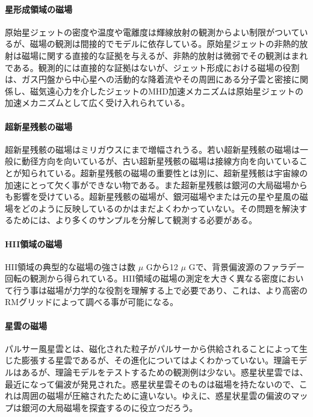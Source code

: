 \paragraph{星形成領域の磁場}

原始星ジェットの密度や温度や電離度は輝線放射の観測からよい制限がついているが、磁場の観測は間接的でモデルに依存している。原始星ジェットの非熱的放射は磁場に関する直接的な証拠を与えるが、非熱的放射は微弱でその観測はまれである。観測的には直接的な証拠はないが、ジェット形成における磁場の役割は、ガス円盤から中心星への活動的な降着流やその周囲にある分子雲と密接に関係し、磁気遠心力を介したジェットのMHD加速メカニズムは原始星ジェットの加速メカニズムとして広く受け入れられている。

\paragraph{超新星残骸の磁場}

超新星残骸の磁場はミリガウスにまで増幅されうる。若い超新星残骸の磁場は一般に動径方向を向いているが、古い超新星残骸の磁場は接線方向を向いていることが知られている。超新星残骸の磁場の重要性とは別に、超新星残骸は宇宙線の加速にとって欠く事ができない物である。また超新星残骸は銀河の大局磁場からも影響を受けている。超新星残骸の磁場が、銀河磁場やまたは元の星や星風の磁場をどのように反映しているのかはまだよくわかっていない。その問題を解決するためには、より多くのサンプルを分解して観測する必要がある。

\paragraph{HII領域の磁場}

HII領域の典型的な磁場の強さは数 $\mu$ Gから12 $\mu$ Gで\citep{2007A&A...463..993S, 2010A&A...515A..64G, 2011ApJ...736...83H}、背景偏波源のファラデー回転の観測から得られている。HII領域の磁場の測定を大きく異なる密度において行う事は磁場が力学的な役割を理解する上で必要であり、これは、より高密のRMグリッドによって調べる事が可能になる。

\paragraph{星雲の磁場}

パルサー風星雲とは、磁化された粒子がパルサーから供給されることによって生じた膨張する星雲であるが、その進化についてはよくわかっていない。理論モデルはあるが、理論モデルをテストするための観測例は少ない。惑星状星雲では、最近になって偏波が発見された。惑星状星雲そのものは磁場を持たないので、これは周囲の磁場が圧縮されたために違いない。ゆえに、惑星状星雲の偏波のマップは銀河の大局磁場を探査するのに役立つだろう。


